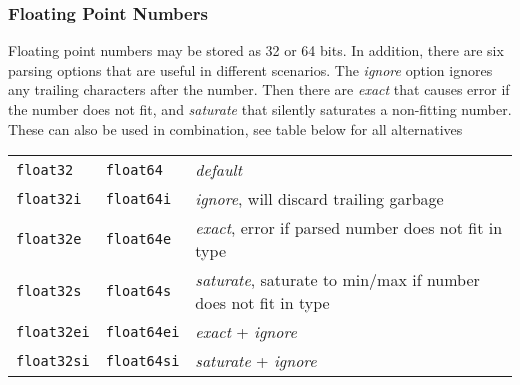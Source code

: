 \subsubsection{Floating Point Numbers}
Floating point numbers may be stored as 32 or 64 bits.  In addition,
there are six parsing options that are useful in different scenarios.
The \emph{ignore} option ignores any trailing characters after the
number.  Then there are \emph{exact} that causes error if the number
does not fit, and \emph{saturate} that silently saturates a
non-fitting number.  These can also be used in combination, see table
below for all alternatives
\begin{leftbar}
\begin{tabular}{p{2cm}p{2cm}p{9cm}}
\texttt{float32} & \texttt{float64} & \emph{default}\\
\texttt{float32i} & \texttt{float64i} & \emph{ignore}, will discard trailing garbage\\
\texttt{float32e} & \texttt{float64e} & \emph{exact}, error if parsed number does not fit in type \\
\texttt{float32s} & \texttt{float64s} & \emph{saturate}, saturate to min/max if number does not fit in type \\
\texttt{float32ei} & \texttt{float64ei} & \emph{exact} + \emph{ignore} \\
\texttt{float32si} & \texttt{float64si} & \emph{saturate} + \emph{ignore} \\
\end{tabular}
\end{leftbar}

